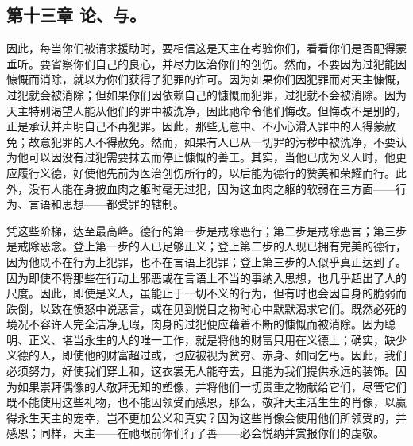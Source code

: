 
\subsection{第十三章  论、与。}

因此，每当你们被请求援助时，要相信这是天主在考验你们，看看你们是否配得蒙垂听。要省察你们自己的良心，并尽力医治你们的创伤。然而，不要因为过犯能因慷慨而消除，就以为你们获得了犯罪的许可。因为如果你们因犯罪而对天主慷慨，过犯就会被消除；但如果你们因依赖自己的慷慨而犯罪，过犯就不会被消除。因为天主特别渴望人能从他们的罪中被洗净，因此祂命令他们悔改。但悔改不是别的，正是承认并声明自己不再犯罪。因此，那些无意中、不小心滑入罪中的人得蒙赦免；故意犯罪的人不得赦免。然而，如果有人已从一切罪的污秽中被洗净，不要认为他可以因没有过犯需要抹去而停止慷慨的善工。其实，当他已成为义人时，他更应履行义德，好使他先前为医治创伤所行的，以后能为德行的赞美和荣耀而行。此外，没有人能在身披血肉之躯时毫无过犯，因为这血肉之躯的软弱在三方面——行为、言语和思想——都受罪的辖制。\par

凭这些阶梯，达至最高峰。德行的第一步是戒除恶行；第二步是戒除恶言；第三步是戒除恶念。登上第一步的人已足够正义；登上第二步的人现已拥有完美的德行，因为他既不在行为上犯罪，也不在言语上犯罪；登上第三步的人似乎真正达到了。因为即使不将那些在行动上邪恶或在言语上不当的事纳入思想，也几乎超出了人的尺度。因此，即使是义人，虽能止于一切不义的行为，但有时也会因自身的脆弱而跌倒，以致在愤怒中说恶言，或在见到悦目之物时心中默默渴求它们。既然必死的境况不容许人完全洁净无瑕，肉身的过犯便应藉着不断的慷慨而被消除。因为聪明、正义、堪当永生的人的唯一工作，就是将他的财富只用在义德上；确实，缺少义德的人，即使他的财富超过或，也应被视为贫穷、赤身、如同乞丐。因此，我们必须努力，好使我们穿上和，这衣裳无人能夺去，且能为我们提供永远的装饰。因为如果崇拜偶像的人敬拜无知的塑像，并将他们一切贵重之物献给它们，尽管它们既不能使用这些礼物，也不能因领受而感恩，那么，敬拜天主活生生的肖像，以赢得永生天主的宠幸，岂不更加公义和真实？因为这些肖像会使用他们所领受的，并感恩；同样，天主——在祂眼前你们行了善——必会悦纳并赏报你们的虔敬。\par


